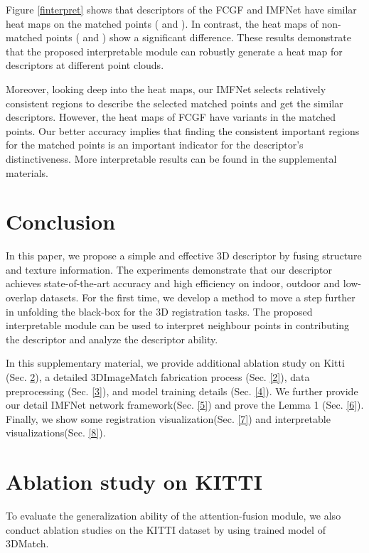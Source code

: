\documentclass[10pt,twocolumn,letterpaper]{article}
\begin{document}
Figure \ref{finterpret} shows that descriptors of the FCGF and IMFNet have similar heat maps on the matched points ( and ). In contrast, the heat maps of non-matched points ( and ) show a significant difference. These results demonstrate that the proposed interpretable module can robustly generate a heat map for descriptors at different point clouds. 

Moreover, looking deep into the heat maps, our IMFNet selects relatively consistent regions to describe the selected matched points and get the similar descriptors. However, the heat maps of FCGF have variants in the matched points. Our better accuracy implies that finding the consistent important regions for the matched points is an important indicator for the descriptor's distinctiveness.  More interpretable results can be found in the supplemental materials.  

\section{Conclusion}
In this paper, we propose a simple and effective 3D descriptor by fusing structure and texture information. The experiments demonstrate that our descriptor achieves state-of-the-art accuracy and high efficiency on indoor, outdoor and low-overlap datasets. For the first time, we develop a method to move a step further in unfolding the black-box for the 3D registration tasks. The proposed interpretable module can be used to interpret neighbour points in contributing the descriptor and analyze the descriptor ability.



{\small
	
	
}

\clearpage
 
\setcounter{section}{0}
In this supplementary material, we provide additional ablation study on Kitti (Sec. \ref{1}), a detailed 3DImageMatch fabrication process (Sec. \ref{2}),  data preprocessing (Sec. \ref{3}), and model training details (Sec. \ref{4}). We further provide our detail IMFNet network framework(Sec. \ref{5}) and prove the Lemma 1 (Sec. \ref{6}). Finally, we show some registration visualization(Sec. \ref{7}) and interpretable visualizations(Sec. \ref{8}).

\section{Ablation study on KITTI}
\label{1}
To evaluate the generalization ability of the attention-fusion module, we also conduct ablation studies on the KITTI dataset by using trained model of 3DMatch.
\end{document}
